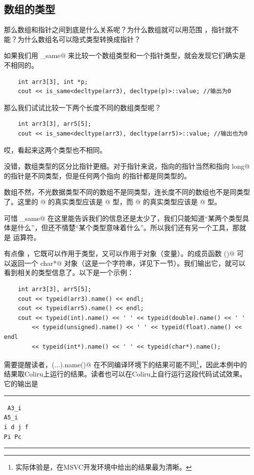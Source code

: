 \subsection*{数组的类型}
那么数组和指针之间到底是什么关系呢？为什么数组就可以用范围 \lstinline@for@，指针就不能？为什么数组名可以隐式类型转换成指针？\par
如果我们用 \lstinline@is_same@ 来比较一个数组类型和一个指针类型，就会发现它们确实是不相同的。
\begin{lstlisting}
    int arr3[3], int *p;
    cout << is_same<decltype(arr3), decltype(p)>::value; //输出为0
\end{lstlisting}\par
那么我们试试比较一下两个长度不同的数组类型呢？
\begin{lstlisting}
    int arr3[3], arr5[5];
    cout << is_same<decltype(arr3), decltype(arr5)>::value; //输出也为0
\end{lstlisting}
哎，看起来这两个类型也不相同。\par
没错，数组类型的区分比指针更细。对于指针来说，指向\lstinline@int@ 的指针当然和指向 \lstinline@long long@ 的指针是不同类型，但是任何两个指向 \lstinline@int@ 的指针都是同类型的。\par
数组不然，不光数据类型不同的数组不是同类型，连长度不同的数组也不是同类型了。这里的 @ 的真实类型应该是 \lstinline@int[3]@ 型，而 @ 的真实类型应该是 \lstinline@int[5]@ 型。\par
可惜 \lstinline@is_same@ 在这里能告诉我们的信息还是太少了，我们只能知道``某两个类型具体是什么''，但还不情楚``某个类型意味着什么''。所以我们还有另一个工具，那就是 \lstinline@typeid@ 运算符。\par
\lstinline@typeid@ 有点像 \lstinline@sizeof@，它既可以作用于类型，又可以作用于对象（变量）。\lstinline@typeid@ 的成员函数 \lstinline@name()@ 可以返回一个 \lstinline@const char*@ 对象（这是一个字符串，详见下一节）。我们输出它，就可以看到相关的类型信息了。以下是一个示例：
\begin{lstlisting}
    int arr3[3], arr5[5];
    cout << typeid(arr3).name() << endl;
    cout << typeid(arr5).name() << endl;
    cout << typeid(int).name() << ' ' << typeid(double).name() << ' '
        << typeid(unsigned).name() << ' ' << typeid(float).name() << endl
        << typeid(int*).name() << ' ' << typeid(char*).name();
\end{lstlisting}
需要提醒读者，\lstinline@typeid(...).name()@ 在不同编译环境下的结果可能不同\footnote{实际体验是，在MSVC开发环境中给出的结果最为清晰。}，因此本例中的结果取Coliru上运行的结果。读者也可以在Coliru上自行运行这段代码试试效果。它的输出是\\\noindent\rule{\linewidth}{.2pt}\texttt{
A3\_i\\
A5\_i\\
i d j f\\
Pi Pc
}\\\noindent\rule{\linewidth}{.2pt}\par
